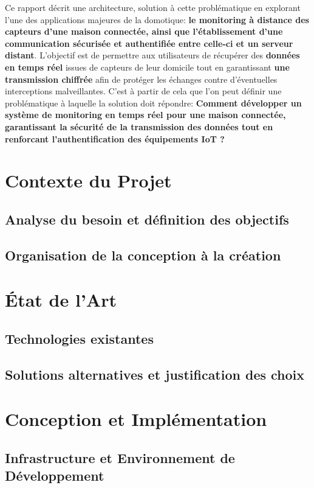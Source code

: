 \documentclass[10pt, a4paper]{report}
\begin{document}
		Ce rapport décrit une architecture, solution à cette problématique en explorant l'une des applications majeures de la domotique: \textbf{le monitoring à distance des capteurs d'une maison connectée, ainsi que l'établissement d'une communication sécurisée et authentifiée entre celle-ci et un serveur distant}. L'objectif est de permettre aux utilisateurs de récupérer des \textbf{données en temps réel} issues de capteurs de leur domicile tout en garantissant \textbf{une transmission chiffrée} afin de protéger les échanges contre d'éventuelles interceptions malveillantes. C'est à partir de cela que l'on peut définir une problématique à laquelle la solution doit répondre: \textbf{Comment développer un système de monitoring en temps réel pour une maison connectée, garantissant la sécurité de la transmission des données tout en renforcant l'authentification des équipements IoT ?}
		
	
	\chapter{Contexte du Projet}
	\section{Analyse du besoin et définition des objectifs}
	\section{Organisation de la conception à la création}
	
	\chapter{État de l'Art}
	\section{Technologies existantes}
	\section{Solutions alternatives et justification des choix}
	
	\chapter{Conception et Implémentation}
	
	\section{Infrastructure et Environnement de Développement}
	
\end{document}
